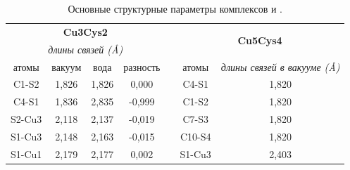 \documentclass[a4paper,12pt]{article}
\begin{document}
\begin{onehalfspace}
	
	\begin{table}[H]
		\caption{Основные структурные параметры комплексов  и .}
		\label{tab5}
		\centering
		\begin{tabular}{|cccc|ccc}
			\cline{1-4} \cline{6-7}
			\multicolumn{4}{|c|}{\textbf{Cu3Cys2}}                                                                      & \multicolumn{1}{c|}{} & \multicolumn{2}{c|}{\multirow{2}{*}{\textbf{Cu5Cys4}}}                        \\ \cline{1-4}
			\multicolumn{4}{|c|}{\textit{длины связей (Å)}}                                                             & \multicolumn{1}{c|}{} & \multicolumn{2}{c|}{}                                                         \\ \cline{1-4} \cline{6-7} 
			\multicolumn{1}{|c|}{атомы}          & \multicolumn{1}{c|}{вакуум} & \multicolumn{1}{c|}{вода}   & разность & \multicolumn{1}{c|}{} & \multicolumn{1}{c|}{атомы}   & \multicolumn{1}{c|}{\textit{длины связей в вакууме (Å)}} \\ \cline{1-4} \cline{6-7} 
			\multicolumn{1}{|c|}{C1-S2}          & \multicolumn{1}{c|}{1,826}  & \multicolumn{1}{c|}{1,826}  & 0,000    & \multicolumn{1}{c|}{} & \multicolumn{1}{c|}{C4-S1}   & \multicolumn{1}{c|}{1,820}                     \\ \cline{1-4} \cline{6-7} 
			\multicolumn{1}{|c|}{C4-S1}          & \multicolumn{1}{c|}{1,836}  & \multicolumn{1}{c|}{2,835}  & -0,999   & \multicolumn{1}{c|}{} & \multicolumn{1}{c|}{C1-S2}   & \multicolumn{1}{c|}{1,820}                     \\ \cline{1-4} \cline{6-7} 
			\multicolumn{1}{|c|}{S2-Cu3}         & \multicolumn{1}{c|}{2,118}  & \multicolumn{1}{c|}{2,137}  & -0,019   & \multicolumn{1}{c|}{} & \multicolumn{1}{c|}{C7-S3}   & \multicolumn{1}{c|}{1,820}                     \\ \cline{1-4} \cline{6-7} 
			\multicolumn{1}{|c|}{S1-Cu3}         & \multicolumn{1}{c|}{2,148}  & \multicolumn{1}{c|}{2,163}  & -0,015   & \multicolumn{1}{c|}{} & \multicolumn{1}{c|}{C10-S4}  & \multicolumn{1}{c|}{1,820}                     \\ \cline{1-4} \cline{6-7} 
			\multicolumn{1}{|c|}{S1-Cu1}         & \multicolumn{1}{c|}{2,179}  & \multicolumn{1}{c|}{2,177}  & 0,002    & \multicolumn{1}{c|}{} & \multicolumn{1}{c|}{S1-Cu3}  & \multicolumn{1}{c|}{2,403}                     \\ \cline{1-4} \cline{6-7} 

\end{tabular}
\end{table}
\end{onehalfspace}
\end{document}
